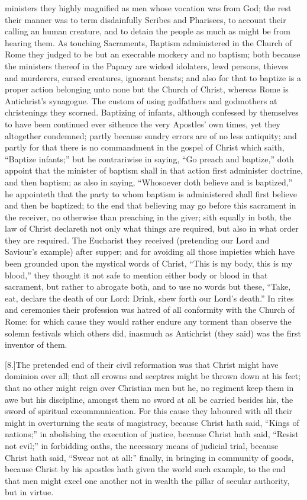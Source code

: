 ministers they highly magnified as men whose vocation was from God; the rest their manner was to term disdainfully Scribes and Pharisees, to account their calling an human creature, and to detain the people as much as might be from hearing them. As touching Sacraments, Baptism administered in the Church of Rome they judged to be but an execrable mockery and no baptism; both because the ministers thereof in the Papacy are wicked idolaters, lewd persons, thieves and murderers, cursed creatures, ignorant beasts; and also for that to baptize is a proper action belonging unto none but the Church of Christ, whereas Rome is Antichrist’s synagogue. The custom of using godfathers and godmothers at christenings they scorned. Baptizing of infants, although confessed by themselves to have been continued ever sithence the very Apostles’ own times, yet they altogether condemned; partly because sundry errors are of no less antiquity; and partly for that there is no commandment in the gospel of Christ which saith, “Baptize infants;” but he contrariwise in saying, “Go preach and baptize,” doth appoint that the minister of baptism shall in that action first administer doctrine, and then baptism; as also in saying, “Whosoever doth believe and is baptized,” he appointeth that the party to whom baptism is administered shall first believe and then be baptized; to the end that believing may go before this sacrament in the receiver, no otherwise than preaching in the giver; sith equally in both, the law of Christ declareth not only what things are required, but also in what order they are required. The Eucharist they received (pretending our Lord and Saviour’s example) after supper; and for avoiding all those impieties which have been grounded upon the mystical words of Christ, “This is my body, this is my blood,” they thought it not safe to mention either body or blood in that sacrament, but rather to abrogate both, and to use no words but these, “Take, eat, declare the death of our Lord: Drink, shew forth our Lord’s death.” In rites and ceremonies their profession was hatred of all conformity with the Church of Rome: for which cause they would rather endure any torment than observe the solemn festivals which others did, inasmuch as Antichrist (they said) was the first inventor of them.

[8.]The pretended end of their civil reformation was that Christ might have dominion over all; that all crowns and sceptres might be thrown down at his feet; that no other might reign over Christian men but he, no regiment keep them in awe but his discipline, amongst them no sword at all be carried besides his, the sword of spiritual excommunication. For this cause they laboured with all their might in overturning the seats of magistracy, because Christ hath said, “Kings of nations;” in abolishing the execution of justice, because Christ hath said, “Resist not evil;” in forbidding oaths, the necessary means of judicial trial, because Christ hath said, “Swear not at all:” finally, in bringing in community of goods, because Christ by his apostles hath given the world such example, to the end that men might excel one another not in wealth the pillar of secular authority, but in virtue.

